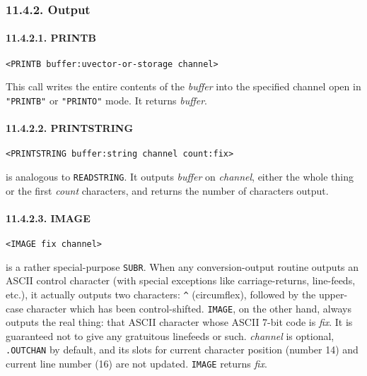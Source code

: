 \documentclass[a4paper,]{article}
\let\oldparagraph\paragraph
\renewcommand{\paragraph}[1]{\oldparagraph{#1}\mbox{}}
\begin{document}
\subsubsection{11.4.2. Output}\label{output-1}

\paragraph{11.4.2.1. PRINTB}\label{printb}

\begin{verbatim}
<PRINTB buffer:uvector-or-storage channel>
\end{verbatim}

 This call writes the entire contents of the \emph{buffer} into the specified channel open in
\texttt{"PRINTB"} or \texttt{"PRINTO"} mode. It returns \emph{buffer}.

\paragraph{11.4.2.2. PRINTSTRING}\label{printstring}

\begin{verbatim}
<PRINTSTRING buffer:string channel count:fix>
\end{verbatim}

 is analogous to \texttt{READSTRING}. It outputs \emph{buffer} on \emph{channel}, either
the whole thing or the first \emph{count} characters, and returns the number of characters output.

\paragraph{11.4.2.3. IMAGE}\label{image}

\begin{verbatim}
<IMAGE fix channel>
\end{verbatim}

 is a rather special-purpose \texttt{SUBR}. When any conversion-output routine outputs an
ASCII control character (with special exceptions like carriage-returns, line-feeds, etc.), it actually outputs two
characters: \texttt{\^{}}  (circumflex), followed by the upper-case character which has been
control-shifted. \texttt{IMAGE}, on the other hand, always outputs the real thing: that ASCII character whose ASCII 7-bit
code is \emph{fix}. It is guaranteed not to give any gratuitous linefeeds or such. \emph{channel} is optional,
\texttt{.OUTCHAN} by default, and its slots for current character position (number 14) and current line number (16) are not
updated. \texttt{IMAGE} returns \emph{fix}.
\end{document}
